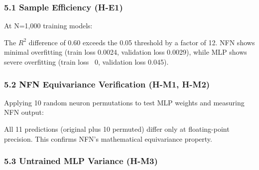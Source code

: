 
\subsubsection{5.1 Sample Efficiency (H-E1)}

At N=1,000 training models:

\begin{table}[htbp]
\centering
{}
\end{table}

The $R^2$ difference of 0.60 exceeds the 0.05 threshold by a factor of 12. NFN shows minimal overfitting (train loss 0.0024, validation loss 0.0029), while MLP shows severe overfitting (train loss ~0, validation loss 0.045).

\subsubsection{5.2 NFN Equivariance Verification (H-M1, H-M2)}

Applying 10 random neuron permutations to test MLP weights and measuring NFN output:

\begin{table}[htbp]
\centering
{}
\end{table}

All 11 predictions (original plus 10 permuted) differ only at floating-point precision. This confirms NFN's mathematical equivariance property.

\subsubsection{5.3 Untrained MLP Variance (H-M3)}

